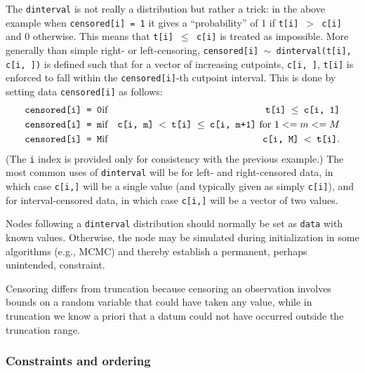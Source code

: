\documentclass[12pt,oneside]{book}\usepackage[]{graphicx}\usepackage[]{color}
\def\cd#1{\texttt{#1}}
\begin{document}
The \cd{dinterval} is not really a distribution but rather a trick: in the above example when \cd{censored[i] = 1} it gives a ``probability'' of 1 if \cd{t[i] $>$ c[i]} and 0 otherwise.  This means that \cd{t[i] $\le$ c[i]} is treated as impossible.  More generally than simple right- or left-censoring, \cd{censored[i] $\sim$ dinterval(t[i], c[i, ])} is defined such that for a vector of increasing cutpoints, \cd{c[i, ]}, \cd{t[i]} is enforced to fall within the \cd{censored[i]}-th cutpoint interval.  This is done by setting data \cd{censored[i]} as follows:
\begin{eqnarray}
\mbox{\cd{censored[i] = 0}} & \mbox{if} & \mbox{\cd{t[i] $\le$ c[i, 1]}} \nonumber \\
\mbox{\cd{censored[i] = m}} & \mbox{if} & \mbox{\cd{c[i, m] $<$ t[i] $\le$ c[i, m+1]} for } 1 <= m <= M \nonumber \\
\mbox{\cd{censored[i] = M}} & \mbox{if} & \mbox{\cd{c[i, M] $<$ t[i]}}.\nonumber
\end{eqnarray}
(The \cd{i} index is provided only for consistency with the previous example.)  The most common uses of \cd{dinterval} will be for left- and right-censored data, in which case \cd{c[i,]} will be a single value (and typically given as simply \cd{c[i]}), and for interval-censored data, in which case \cd{c[i,]} will be a vector of two values.  

Nodes following a \cd{dinterval} distribution should normally be set
as \cd{data} with known values. Otherwise, the node may be simulated during initialization in some algorithms (e.g., MCMC) and thereby establish a permanent, perhaps unintended, constraint.  

Censoring differs from truncation because censoring an observation involves bounds on a random variable that could have taken any value, while in truncation we know a priori that a datum could not have occurred outside the truncation range.  


\subsubsection{Constraints and ordering}
\end{document}
